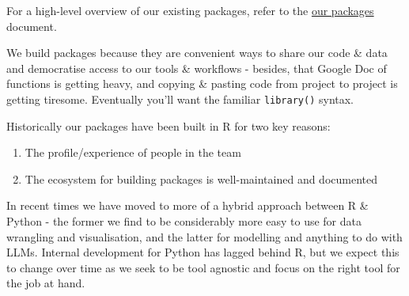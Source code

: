\documentclass[
  letterpaper,
  DIV=11,
  numbers=noendperiod]{scrreprt}
\providecommand{\tightlist}{%
  \setlength{\itemsep}{0pt}\setlength{\parskip}{0pt}}\usepackage{longtable,booktabs,array}
\begin{document}
\begin{tcolorbox}[enhanced jigsaw, opacitybacktitle=0.6, breakable, title=\textcolor{quarto-callout-note-color}{\faInfo}\hspace{0.5em}{Note}, arc=.35mm, colframe=quarto-callout-note-color-frame, colbacktitle=quarto-callout-note-color!10!white, left=2mm, bottomrule=.15mm, opacityback=0, toprule=.15mm, bottomtitle=1mm, toptitle=1mm, titlerule=0mm, leftrule=.75mm, colback=white, rightrule=.15mm, coltitle=black]

For a high-level overview of our existing packages, refer to the
\href{packages.qmd}{our packages} document.

\end{tcolorbox}

We build packages because they are convenient ways to share our code \&
data and democratise access to our tools \& workflows - besides, that
Google Doc of functions is getting heavy, and copying \& pasting code
from project to project is getting tiresome. Eventually you'll want the
familiar \texttt{library()} syntax.

Historically our packages have been built in R for two key reasons:

\begin{enumerate}
\def\labelenumi{\arabic{enumi}.}
\tightlist
\item
  The profile/experience of people in the team
\item
  The ecosystem for building packages is well-maintained and documented
\end{enumerate}

In recent times we have moved to more of a hybrid approach between R \&
Python - the former we find to be considerably more easy to use for data
wrangling and visualisation, and the latter for modelling and anything
to do with LLMs. Internal development for Python has lagged behind R,
but we expect this to change over time as we seek to be tool agnostic
and focus on the right tool for the job at hand.
\end{document}
